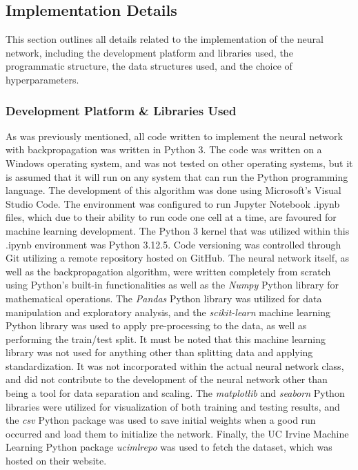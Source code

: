\documentclass[a4paper]{article}
\begin{document}
\subsection{Implementation Details}

This section outlines all details related to the implementation of the neural network, including the development platform and libraries used, the programmatic structure, the data structures used, and the choice of hyperparameters.

\subsubsection{Development Platform \& Libraries Used}

As was previously mentioned, all code written to implement the neural network with backpropagation was written in Python 3. The code was written on a Windows operating system, and was not tested on other operating systems, but it is assumed that it will run on any system that can run the Python programming language. The development of this algorithm was done using Microsoft's Visual Studio Code. The environment was configured to run Jupyter Notebook .ipynb files, which due to their ability to run code one cell at a time, are favoured for machine learning development. The Python 3 kernel that was utilized within this .ipynb environment was Python 3.12.5. Code versioning was controlled through Git utilizing a remote repository hosted on GitHub. The neural network itself, as well as the backpropagation algorithm, were written completely from scratch using Python's built-in functionalities as well as the \textit{Numpy} Python library for mathematical operations. The \textit{Pandas} Python library was utilized for data manipulation and exploratory analysis, and the \textit{scikit-learn} machine learning Python library was used to apply pre-processing to the data, as well as performing the train/test split. It must be noted that this machine learning library was not used for anything other than splitting data and applying standardization. It was not incorporated within the actual neural network class, and did not contribute to the development of the neural network other than being a tool for data separation and scaling. The \textit{matplotlib} and \textit{seaborn} Python libraries were utilized for visualization of both training and testing results, and the \textit{csv} Python package was used to save initial weights when a good run occurred and load them to initialize the network. Finally, the UC Irvine Machine Learning Python package \textit{ucimlrepo} was used to fetch the dataset, which was hosted on their website. 
\end{document}
